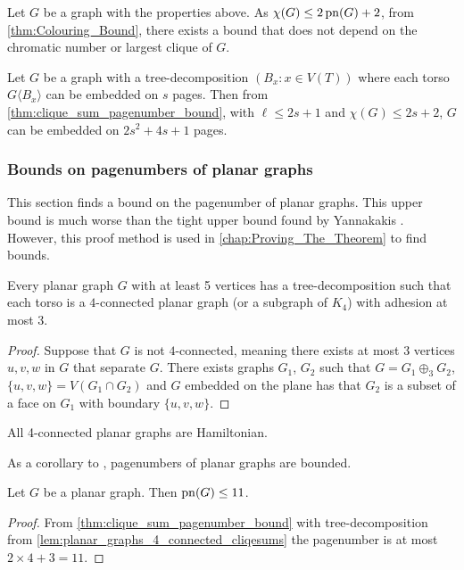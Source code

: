 Let $G$ be a graph with the properties above. As \(\chi(G) \leq 2 \operatorname{pn}(G) + 2\), from \cref{thm:Colouring_Bound}, there exists a bound that does not depend on the chromatic number or largest clique of \(G\).
\begin{corollary}\label{corr:bded_pn_tree_decomp}
	Let \(G\) be a graph with a tree-decomposition \((B_x: x \in V(T))\) where each torso \(G \langle B_x \rangle\) can be embedded on $s$ pages. Then from \cref{thm:clique_sum_pagenumber_bound}, with $\ell \leq 2s + 1$ and $\chi(G) \leq 2 s + 2$, \(G\) can be embedded on \(2s^2 + 4s + 1\) pages.
\end{corollary}

\subsubsection{Bounds on pagenumbers of planar graphs}
This section finds a bound on the pagenumber of planar graphs. This upper bound is much worse than the tight upper bound found by Yannakakis \cite{yannakakisEmbeddingPlanarGraphs1989}. However, this proof method is used in \cref{chap:Proving_The_Theorem} to find bounds. 

\begin{lemma}\label{lem:planar_graphs_4_connected_cliqesums}
	Every planar graph \(G\) with at least 5 vertices has a tree-decomposition such that each torso is a \(4\)-connected planar graph (or a subgraph of $K_4$) with adhesion at most \(3\).
\end{lemma}

\begin{proof}
	Suppose that $G$ is not $4$-connected, meaning there exists at most $3$ vertices $u, v, w$ in $G$ that separate $G$. There exists graphs $G_1$, $G_2$ such that $G = G_1 \oplus_3 G_2$, $\{u, v, w\} = V(G_1 \cap G_2)$ and $G$ embedded on the plane has that $G_2$ is a subset of a face on $G_1$ with boundary $\{u, v, w\}$. 
\end{proof}

\begin{theorem}\label{thm:4-connected_planar_ham_cycle}
	All 4-connected planar graphs are Hamiltonian.
\end{theorem}

As a corollary to \textcite{hickingbothamStackNumberCliqueSum2023}, pagenumbers of planar graphs are bounded.

\begin{theorem}\label{thm:Planar Graph Hickingbotham Bound}
	Let \(G\) be a planar graph. Then \(\operatorname{pn}(G) \leq 11\).
\end{theorem}
\begin{proof}
	From \cref{thm:clique_sum_pagenumber_bound} with tree-decomposition from \cref{lem:planar_graphs_4_connected_cliqesums} the pagenumber is at most \(2 \times 4 + 3 = 11\).
\end{proof}


